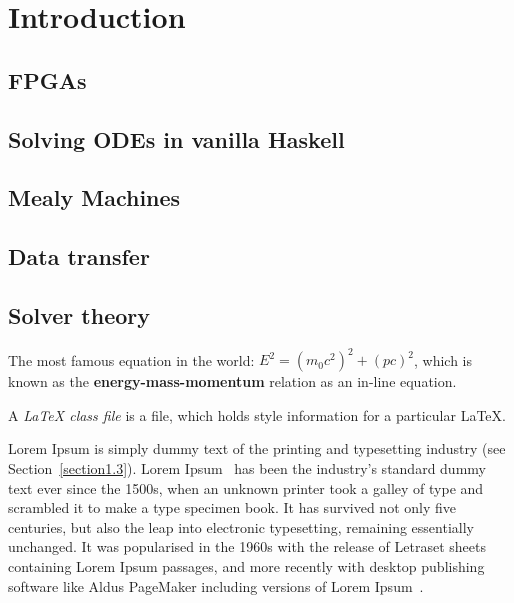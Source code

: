\chapter{Introduction} 

\section{FPGAs}

\section{Solving ODEs in vanilla Haskell}
\lstset{style=haskellStyle}


\section{Mealy Machines}

\section{Data transfer}

\section{Solver theory}

The most famous equation in the world: $E^2 = (m_0c^2)^2 + (pc)^2$, which is 
known as the \textbf{energy-mass-momentum} relation as an in-line equation.

A {\em \LaTeX{} class file} is a file, which holds style information for a particular \LaTeX{}.

Lorem Ipsum is simply dummy text of the printing and typesetting industry (see 
Section~\ref{section1.3}). Lorem Ipsum~\citep{Aup91} has been the industry's 
standard dummy text ever since the 1500s, when an unknown printer took a galley 
of type and scrambled it to make a type specimen book. It has survived not only 
five centuries, but also the leap into electronic typesetting, remaining 
essentially unchanged. It was popularised in the 1960s with the release of 
Letraset sheets containing Lorem Ipsum passages, and more recently with desktop 
publishing software like Aldus PageMaker including versions of Lorem 
Ipsum~\citep{AAB95,Con90,LM65}.